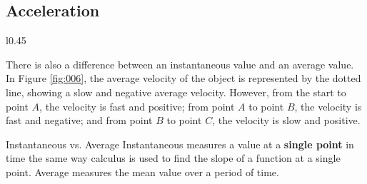 \documentclass[12pt]{article}
\begin{document}
\newpage

\subsection{Acceleration}

\begin{wrapfigure}{l}{0.45\textwidth}
  \centering
  
  \caption{Instantaneous vs. Average Velocity}
  \label{fig:006}
\end{wrapfigure}

There is also a difference between an instantaneous value and an average value. In Figure
\ref{fig:006}, the average velocity of the object is represented by the dotted line,
showing a slow and negative average velocity. However, from the start to point $A$, the
velocity is fast and positive; from point $A$ to point $B$, the velocity is fast and
negative; and from point $B$ to point $C$, the velocity is slow and positive.

\begin{definition}{Instantaneous vs. Average}
  Instantaneous measures a value at a \textbf{single point} in time the same way calculus
  is used to find the slope of a function at a single point. Average measures the mean
  value over a period of time.
\end{definition}
\end{document}
